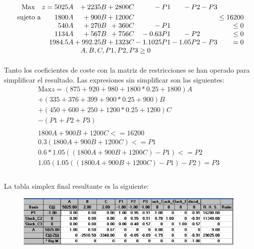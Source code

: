 \documentclass[10pt, a4paper]{article}
\begin{document}
			\[
			  \begin{array}{r@{}r@{}r@{}r@{}r@{}r@{}r@{}l}
			    \text{Max} \quad z = 	5025A	&{} + 2235B		&{} + 2800C 	&{}	-P1 	&{} -P2		&{} -P3 	&{}\\[\jot]
			    \text{sujeto a}\qquad 	1800A 	&{} + 900B		&{} + 1200C	&{} 		&{}			&{}			&{}	\leq 16200 \\
			                     		540A 	&{} + 270B		&{} + 360C	&{}	-P1		&{}			&{}			&{}	\leq 0 \\
								 		1134A 	&{} + 567B		&{} + 756C	&{}	-0.63P1	&{}	-P2		&{} 		&{}	\leq 0 \\
								 		1984.5A &{} + 992.25B	&{} + 1323C	&{}-1.1025P1&{}	-1.05P2	&{}  -P3	&{}	= 0  \\
			     \multicolumn{6}{c}{ A, B, C, P1, P2, P3 \geq 0}


			  \end{array}
			\]

			\paragraph{}
			Tanto los coeficientes de coste con la matriz de restricciones se han operado para simplificar el resultado. Las expresiones sin simplificar son las siguientes:
			\[
				\begin{split}
					\text{Max} z = (875 + 920 + 980 + 1800 * 0.25 + 1800)A \\
					+ (335 + 376 + 399 + 900 * 0.25 + 900)B \\
					+(450 + 600 + 250 + 1200 * 0.25 + 1200)C \\
					-(P1 + P2 + P3) \\ \\
					1800A + 900B + 1200C <= 16200 \\
					0.3(1800A + 900B + 1200C) <= P1 \\
					0.6*1.05((1800A + 900B + 1200C)-P1) <= P2 \\
					1.05(1.05((1800A + 900B + 1200C)-P1)-P2) = P3\\
				\end{split}
			\]

			\paragraph{}
			La tabla simplex final resultante es la siguiente:

			\begin{figure}[H]
			\centering
				\includegraphics[width=\textwidth]{res/Exercise_2_pp_simplex_final.png}
			\end{figure}
\end{document}
